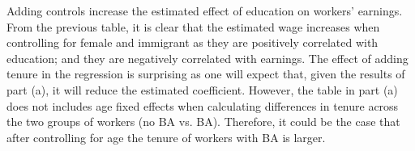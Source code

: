 \documentclass[letterpaper,12pt]{article}
\theoremstyle{dotlessS}
\begin{document}
\begin{enumerate}[label=(\alph*)]
\begin{table}[H]
\begin{center}
\caption{Returns to Finishing a four-year university degree}
\label{table1}
\end{center}
\captionsetup{width=0.80\textwidth}
\captionsetup{skip=0pt}
\caption*{\textbf{Note:} This table displays the returns to finishing a four-year degree or higher. The source are author's own calculations from the Canadian Labour Force Survey }
\end{table}
Adding controls increase the estimated effect of education on workers' earnings. From the previous table, it is clear that the estimated wage increases when controlling for female and immigrant as they are positively correlated with education; and they are negatively correlated with earnings. The effect of adding tenure in the regression is surprising as one will expect that, given the results of part (a), it will reduce the estimated coefficient. However, the table in part (a) does not includes age fixed effects when calculating differences in tenure across the two groups of workers (no BA vs. BA). Therefore, it could be the case that after controlling for age the tenure of workers with BA is larger. \\

\end{enumerate}
\end{document}
